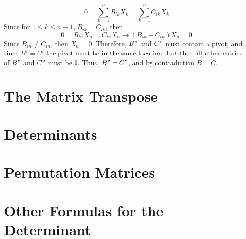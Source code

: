 \documentclass[openany]{book}
\begin{document}
\begin{itemize}
$$0 = \sum_{k=1}^n B_{ik}X_k = \sum_{k=1}^n C_{ik}X_k$$
Since for $1 \leq k \leq n-1$, $B_{ik} = C_{ik}$, then
$$0 = B_{in}X_n = C_{in}X_n \rightarrow (B_{in} - C_{in})X_n = 0$$
Since $B_{in} \neq C_{in}$, then $X_n = 0$. Therefore, $B"$ and $C"$ must contain a pivot, and since $B' = C'$ the pivot must be in the same location. But then all other entries of $B"$ and $C"$ must be 0. Thus, $B" = C"$, and by contradiction $B = C$.
\end{itemize}
\section{The Matrix Transpose}
\section{Determinants}
\section{Permutation Matrices}
\section{Other Formulas for the Determinant}
\end{document}
